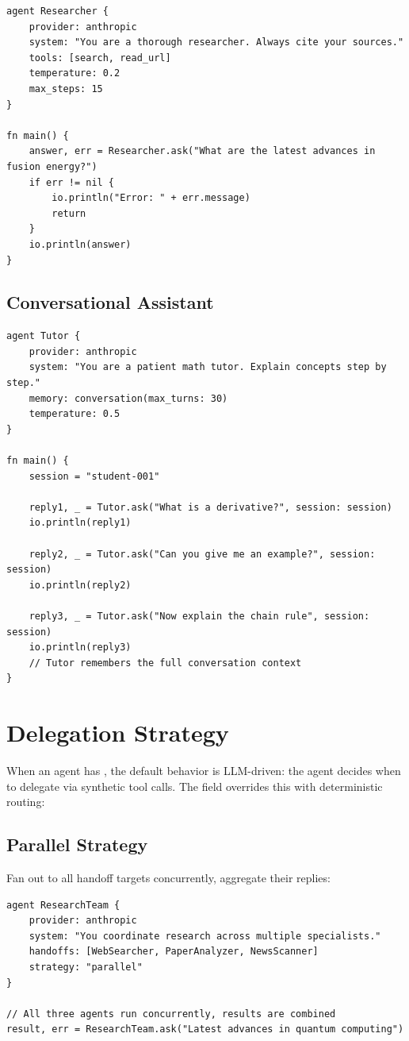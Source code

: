 \begin{lstlisting}
agent Researcher {
    provider: anthropic
    system: "You are a thorough researcher. Always cite your sources."
    tools: [search, read_url]
    temperature: 0.2
    max_steps: 15
}

fn main() {
    answer, err = Researcher.ask("What are the latest advances in fusion energy?")
    if err != nil {
        io.println("Error: " + err.message)
        return
    }
    io.println(answer)
}
\end{lstlisting}

\subsection{Conversational Assistant}

\begin{lstlisting}
agent Tutor {
    provider: anthropic
    system: "You are a patient math tutor. Explain concepts step by step."
    memory: conversation(max_turns: 30)
    temperature: 0.5
}

fn main() {
    session = "student-001"

    reply1, _ = Tutor.ask("What is a derivative?", session: session)
    io.println(reply1)

    reply2, _ = Tutor.ask("Can you give me an example?", session: session)
    io.println(reply2)

    reply3, _ = Tutor.ask("Now explain the chain rule", session: session)
    io.println(reply3)
    // Tutor remembers the full conversation context
}
\end{lstlisting}

\section{Delegation Strategy}

When an agent has , the default behavior is LLM-driven: the agent decides when to delegate via synthetic tool calls. The  field overrides this with deterministic routing:

\subsection{Parallel Strategy}

Fan out to all handoff targets concurrently, aggregate their replies:

\begin{lstlisting}
agent ResearchTeam {
    provider: anthropic
    system: "You coordinate research across multiple specialists."
    handoffs: [WebSearcher, PaperAnalyzer, NewsScanner]
    strategy: "parallel"
}

// All three agents run concurrently, results are combined
result, err = ResearchTeam.ask("Latest advances in quantum computing")
\end{lstlisting}

